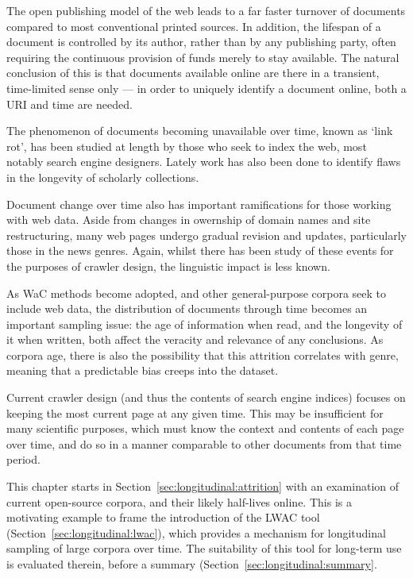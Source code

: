 The open publishing model of the web leads to a far faster turnover of documents compared to most conventional printed sources.  In addition, the lifespan of a document is controlled by its author, rather than by any publishing party, often requiring the continuous provision of funds merely to stay available.  The natural conclusion of this is that documents available online are there in a transient, time-limited sense only --- in order to uniquely identify a document online, both a URI and time are needed.

The phenomenon of documents becoming unavailable over time, known as `link rot', has been studied at length by those who seek to index the web, most notably search engine designers.  Lately work has also been done to identify flaws in the longevity of scholarly collections\cite{101371journalpone0115253}.

Document change over time also has important ramifications for those working with web data.  Aside from changes in owernship of domain names and site restructuring, many web pages undergo gradual revision and updates, particularly those in the news genres.  Again, whilst there has been study of these events for the purposes of crawler design, the linguistic impact is less known.

As WaC methods become adopted, and other general-purpose corpora seek to include web data, the distribution of documents through time becomes an important sampling issue: the age of information when read, and the longevity of it when written, both affect the veracity and relevance of any conclusions.  As corpora age, there is also the possibility that this attrition correlates with genre, meaning that a predictable bias creeps into the dataset.

Current crawler design (and thus the contents of search engine indices) focuses on keeping the most current page at any given time.  This may be insufficient for many scientific purposes, which must know the context and contents of each page over time, and do so in a manner comparable to other documents from that time period.

This chapter starts in Section~\ref{sec:longitudinal:attrition} with an examination of current open-source corpora, and their likely half-lives online.  This is a motivating example to frame the introduction of the LWAC tool (Section~\ref{sec:longitudinal:lwac}), which provides a mechanism for longitudinal sampling of large corpora over time.  The suitability of this tool for long-term use is evaluated therein, before a summary (Section~\ref{sec:longitudinal:summary}.



